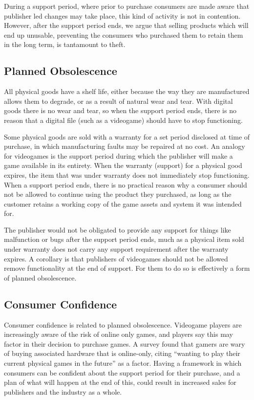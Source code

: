 During a support period, where prior to purchase consumers are made aware that publisher led changes may take place, this kind of activity is not in contention.
However, after the support period ends, we argue that selling products which will end up unusable, preventing the consumers who purchased them to retain them in the long term, is tantamount to theft.

\subsection{Planned Obsolescence}
All physical goods have a shelf life, either because the way they are manufactured allows them to degrade, or as a result of natural wear and tear.
With digital goods there is no wear and tear, so when the support period ends, there is no reason that a digital file (such as a videogame) should have to stop functioning.

Some physical goods are sold with a warranty for a set period disclosed at time of purchase, in which manufacturing faults may be repaired at no cost.
An analogy for videogames is the support period during which the publisher will make a game available in its entirety.
When the warranty (support) for a physical good expires, the item that was under warranty does not immediately stop functioning.
When a support period ends, there is no practical reason why a consumer should not be allowed to continue using the product they purchased,
as long as the customer retains a working copy of the game \glspl{asset} and system it was intended for.

The publisher would not be obligated to provide any support for things like malfunction or bugs after the support period ends,
much as a physical item sold under warranty does not carry any support requirement after the warranty expires.
A corollary is that publishers of videogames should not be allowed remove functionality at the end of support.
For them to do so is effectively a form of planned obsolescence.

\subsection{Consumer Confidence}
Consumer confidence is related to planned obsolescence.
Videogame players are increasingly aware of the risk of online only games,
and players say this may factor in their decision to purchase games\cite{2k-topspin-2024}.
A survey found that gamers are wary of buying associated hardware that is online-only,
citing ``wanting to play their current physical games in the future'' as a factor\cite{console-wary-2019}.
Having a framework in which consumers can be confident about the support period for their purchase, and a plan of what will happen at the end of this,
could result in increased sales for publishers and the industry as a whole.

